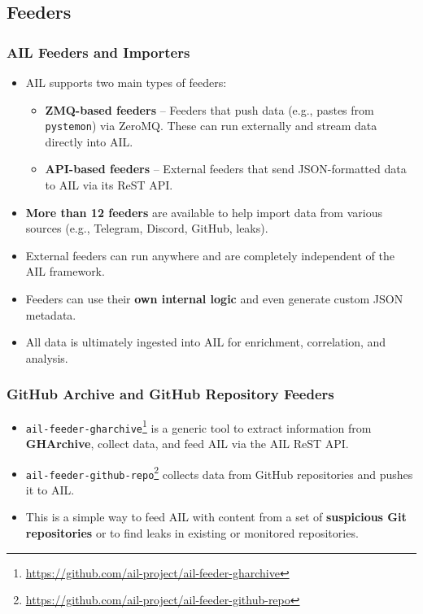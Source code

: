 \documentclass[10pt,aspectratio=169, colorlinks=true, linkcolor=circlBlue]{beamer}
\begin{document}
\subsection{Feeders}


\begin{frame}[fragile]
    \frametitle{AIL Feeders and Importers}
    \begin{itemize}
    	\item AIL supports two main types of feeders:
        \begin{itemize}
            \item {\bf ZMQ-based feeders} – Feeders that push data (e.g., pastes from \texttt{pystemon}) via ZeroMQ. These can run externally and stream data directly into AIL.
            \item {\bf API-based feeders} – External feeders that send JSON-formatted data to AIL via its ReST API.
        \end{itemize}
    
        \item {\bf More than 12 feeders} are available to help import data from various sources (e.g., Telegram, Discord, GitHub, leaks).
        \item External feeders can run anywhere and are completely independent of the AIL framework.
        \item Feeders can use their {\bf own internal logic} and even generate custom JSON metadata.
        \item All data is ultimately ingested into AIL for enrichment, correlation, and analysis.
    \end{itemize}
\end{frame}

\begin{frame}[fragile]
    \frametitle{GitHub Archive and GitHub Repository Feeders}
    \begin{itemize}
        \item \texttt{ail-feeder-gharchive}\footnote{\url{https://github.com/ail-project/ail-feeder-gharchive}} is a generic tool to extract information from {\bf GHArchive}, collect data, and feed AIL via the AIL ReST API.
        
        \item \texttt{ail-feeder-github-repo}\footnote{\url{https://github.com/ail-project/ail-feeder-github-repo}} collects data from GitHub repositories and pushes it to AIL.
        
        \item This is a simple way to feed AIL with content from a set of {\bf suspicious Git repositories} or to find leaks in existing or monitored repositories.
    \end{itemize}
\end{frame}
\end{document}
